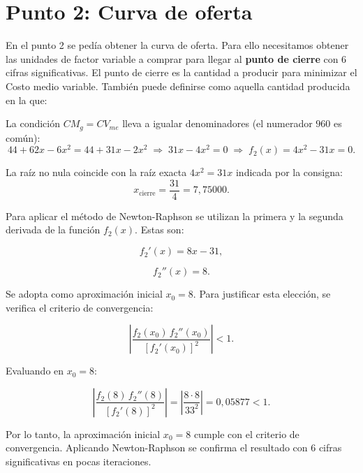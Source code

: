 \section{Punto 2: Curva de oferta}

En el punto 2 se pedía obtener la curva de oferta. Para ello necesitamos obtener las unidades de factor variable a comprar para llegar al \textbf{punto de cierre} con 6 cifras significativas. El punto de cierre es la cantidad a producir para minimizar el Costo medio variable. También puede definirse como aquella cantidad producida en la que:

La condición $CM_g = CV_{me}$ lleva a igualar denominadores (el numerador $960$ es común):
\begin{equation}
    44 + 62x - 6x^2 = 44 + 31x - 2x^2
    \;\Longrightarrow\; 31x - 4x^2 = 0
    \;\Longrightarrow\; f_2(x) = 4x^2 - 31x = 0.
\end{equation}

La raíz no nula coincide con la raíz exacta $4x^2 = 31x$ indicada por la consigna:
\begin{equation}
    \boxed{x_{\text{cierre}} = \frac{31}{4} = 7{,}75000.}
\end{equation}

Para aplicar el método de Newton-Raphson se utilizan la primera y la segunda derivada de la función $f_2(x)$. Estas son:

\begin{equation}
    f_2'(x) = 8x - 31,
\end{equation}

\begin{equation}
    f_2''(x) = 8.
\end{equation}

Se adopta como aproximación inicial $x_0 = 8$. Para justificar esta elección, se verifica el criterio de convergencia:

\begin{equation}
    \left|
    \frac{f_2(x_0)\,f_2''(x_0)}
    {[f_2'(x_0)]^2}
    \right| < 1.
\end{equation}

Evaluando en $x_0 = 8$:

\begin{equation}
    \left|
    \frac{f_2(8)\,f_2''(8)}
    {[f_2'(8)]^2}
    \right|
    =
    \left|
    \frac{8 \cdot 8}{33^2}
    \right|
    =
    0{,}05877 < 1.
\end{equation}

Por lo tanto, la aproximación inicial $x_0 = 8$ cumple con el criterio de convergencia. Aplicando Newton-Raphson se confirma el resultado con 6 cifras significativas en pocas iteraciones.

